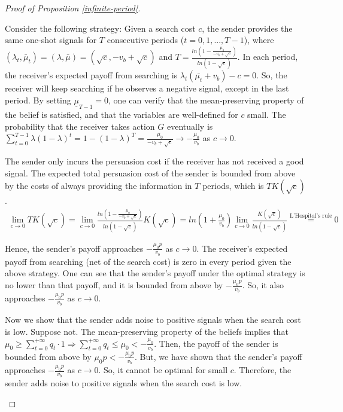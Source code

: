 \documentclass[11pt]{extarticle}
\newcommand{\ra}{\Rightarrow}
\begin{document}
\begin{proof}[Proof of Proposition \ref{infinite-period}]
\begin{enumerate}[(1)]
	Consider the following strategy: Given a search cost $c$, the sender provides the same one-shot signals for $T$ consecutive periods ($t=0,1,...,T-1$), where $(\lambda_{t},\bar{\mu}_{t}) = (\lambda,\bar{\mu}) = (\sqrt{c},-v_b+\sqrt{c})$ and $T = \frac{ln\left(1-\frac{\mu_0}{-v_b+\sqrt{c}}\right)}{ln(1-\sqrt{c})}$. In each period, the receiver's expected payoff from searching is $\lambda_t (\bar{\mu_t} + v_b) - c = 0$. So, the receiver will keep searching if he observes a negative signal, except in the last period. By setting $\underline{\mu}_{T-1} = 0$, one can verify that the mean-preserving property of the belief is satisfied, and that the variables are well-defined for $c$ small. The probability that the receiver takes action $G$ eventually is $\sum_{t=0}^{T-1} \lambda (1-\lambda)^t = 1-(1-\lambda)^T = \frac{\mu_0}{-v_b+\sqrt{c}} \rightarrow -\frac{\mu_0}{v_b}$ as $c\rightarrow0$.
	
	The sender only incurs the persuasion cost if the receiver has not received a good signal. The expected total persuasion cost of the sender is bounded from above by the costs of always providing the information in $T$ periods, which is $T K(\sqrt{c})$.
	\begin{align*}
		\lim_{c\rightarrow 0} T K(\sqrt{c}) = \lim_{c\rightarrow 0} \frac{ln\left(1-\frac{\mu_0}{-v_b+\sqrt{c}}\right)}{ln(1-\sqrt{c})} K(\sqrt{c}) = ln\left(1+\frac{\mu_0}{v_b}\right) \lim_{c\rightarrow 0} \frac{K(\sqrt{c})}{ln(1-\sqrt{c})} \overset{\text{L'Hospital's rule}}{=} 0
	\end{align*}
	
	Hence, the sender's payoff approaches $-\frac{\mu_0 p}{v_b}$ as $c \rightarrow 0$. The receiver's expected payoff from searching (net of the search cost) is zero in every period given the above strategy. One can see that the sender's payoff under the optimal strategy is no lower than that payoff, and it is bounded from above by $-\frac{\mu_0 p}{v_b}$. So, it also approaches $-\frac{\mu_0 p}{v_b}$ as $c \rightarrow 0$.
	
	Now we show that the sender adds noise to positive signals when the search cost is low. Suppose not. The mean-preserving property of the beliefs implies that $\mu_0 \geq \sum_{t=0}^{+\infty} q_t \cdot 1 \ra \sum_{t=0}^{+\infty} q_t \leq \mu_0 < -\frac{\mu_0}{v_b}$. Then, the payoff of the sender is bounded from above by $\mu_0 p < -\frac{\mu_0 p}{v_b}$. But, we have shown that the sender's payoff approaches $-\frac{\mu_0 p}{v_b}$ as $c \rightarrow 0$. So, it cannot be optimal for small $c$. Therefore, the sender adds noise to positive signals when the search cost is low.

	\end{enumerate}


\end{proof}
\end{document}
